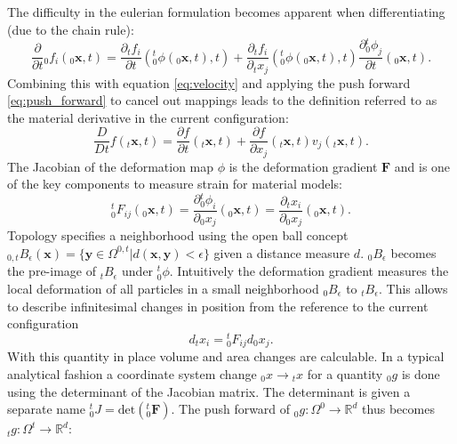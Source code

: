 \documentclass[m,times]{cgMA}
\begin{document}
The difficulty in the eulerian formulation becomes apparent when differentiating (due to the chain rule):
\begin{equation} \label{eq:eulerian_general}
  \frac {\partial}{\partial t} {_0f_i } ( {_0\boldsymbol { x }} ,  t  ) =
  \frac { \partial  {_tf_i} } { \partial t } ( {^t_0}\phi ( {_0\boldsymbol {x }} , t ) , t ) + \frac { \partial  {_tf_i }} { \partial {_tx_j} } ( {^t_0}\phi ( {_0\boldsymbol { x }} , t ) , t ) \frac { \partial {^t_0}\phi_j } { \partial t } ( {_0\boldsymbol { x }} , t ).
\end{equation}
Combining this with equation \ref{eq:velocity} and applying the push forward \ref{eq:push_forward} to cancel out mappings leads to the definition referred to as the material derivative in the current configuration:
\begin{equation} \label{eq:material_derivative}
  \frac {  { D } } {   { D }   { t } }   {  {f} } ( _t\boldsymbol { x } ,   { t } ) = \frac { \partial   {  {f} } } { \partial   { t } } ( _t\boldsymbol {x } ,   { t } ) + \frac { \partial   {  {f} } } { \partial x _ {   { j } } } ( _t{\boldsymbol { x }} ,   { t } )  {v} _ {   { j } } ( _t\boldsymbol { x } ,   { t } ).
\end{equation}
The Jacobian of the deformation map $\phi$ is the deformation gradient $\boldsymbol{F}$ and is one of the key components to measure strain for material models:
\begin{equation}
  {^t_0 F_{ij}} ( _0\boldsymbol {x} ,  t  ) = \frac { \partial {^t_0\phi_i} } { \partial _0 x _j } ( _0\boldsymbol { x } , t ) = \frac { \partial _t x _i } { \partial _0 x_j } ( _0\boldsymbol { x } , t ).
\end{equation}
Topology specifies a neighborhood using the open ball concept $_{0,t}B_\epsilon(\boldsymbol{x}) = \{\boldsymbol{y} \in {\Omega^{0,t} | d(\boldsymbol{x},\boldsymbol{y}) < \epsilon}\}$ given a distance measure $d$. $_0B_\epsilon$ becomes the pre-image of $_tB_\epsilon$ under $_0^t\phi$. Intuitively the deformation gradient measures the local deformation of all particles in a small neighborhood $_0B_\epsilon$ to $_tB_\epsilon$. This allows to describe infinitesimal changes in position from the reference to the current configuration
\begin{equation}\label{eq:def_grad_pos}
  d {_tx_i} = {^t_0}F{_{ij}} d{_0x_j}.
\end{equation}
With this quantity in place volume and area changes are calculable. In a typical analytical fashion a coordinate system change $_0x \rightarrow {_tx}$ for a quantity $_0g$ is done using the determinant of the Jacobian matrix. The determinant is given a separate name $^t_0J =\text{det}(^t_0\boldsymbol{F})$. The push forward of $_0g:\Omega^0\rightarrow \mathbb{R}^d$ thus becomes $_tg:\Omega^t\rightarrow \mathbb{R}^d$:
\end{document}
